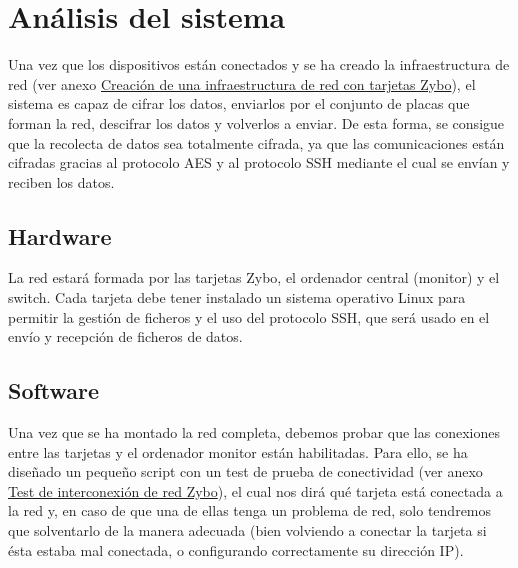 \section{Análisis del sistema}
Una vez que los dispositivos están conectados y se ha creado la infraestructura de red (ver anexo \hyperlink{CreacionInfraestructura}{Creación de una infraestructura de red con tarjetas Zybo}), el sistema es capaz de cifrar los datos, enviarlos por el conjunto de placas que forman la red, descifrar los datos y volverlos a enviar. De esta forma, se consigue que la recolecta de datos sea totalmente cifrada, ya que las comunicaciones están cifradas gracias al protocolo AES y al protocolo SSH mediante el cual se envían y reciben los datos.

\subsection{Hardware}
La red estará formada por las tarjetas Zybo, el ordenador central (monitor) y el switch. Cada tarjeta debe tener instalado un sistema operativo Linux para permitir la gestión de ficheros y el uso del protocolo SSH, que será usado en el envío y recepción de ficheros de datos.

\subsection{Software}
Una vez que se ha montado la red completa, debemos probar que las conexiones entre las tarjetas y el ordenador monitor están habilitadas. Para ello, se ha diseñado un pequeño script con un test de prueba de conectividad (ver anexo \hyperlink{TestConexion}{Test de interconexión de red Zybo}), el cual nos dirá qué tarjeta está conectada a la red y, en caso de que una de ellas tenga un problema de red, solo tendremos que solventarlo de la manera adecuada (bien volviendo a conectar la tarjeta si ésta estaba mal conectada, o configurando correctamente su dirección IP).